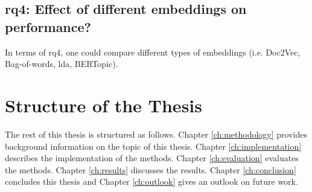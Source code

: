 \subsection[\acs{rq}4]{\ac{rq}4: Effect of different embeddings on performance?}\label{subsec:rq4}
In terms of \ac{rq}4, one could compare different types of embeddings (i.e. Doc2Vec, Bag-of-words, \ac{lda}, BERTopic).



\section{Structure of the Thesis}\label{sec:structure-of-the-thesis}
The rest of this thesis is structured as follows.
Chapter \ref{ch:methodology} provides background information on the topic of this thesis.
Chapter \ref{ch:implementation} describes the implementation of the methods.
Chapter \ref{ch:evaluation} evaluates the methods.
Chapter \ref{ch:results} discusses the results.
Chapter \ref{ch:conclusion} concludes this thesis and 
Chapter \ref{ch:outlook} gives an outlook on future work.